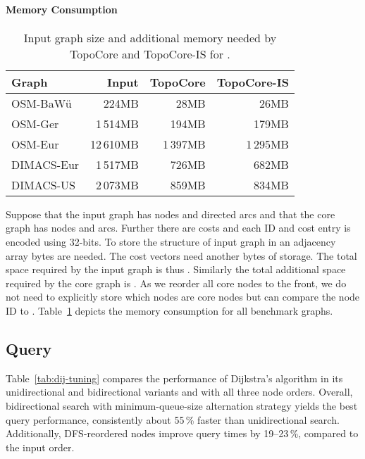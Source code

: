 \documentclass{sig-alternate}
\begin{document}
\paragraph{Memory Consumption}

\begin{table}
\caption{\label{tab:memory}Input graph size and additional memory needed by TopoCore and TopoCore-IS for .}
\begin{centering}
\begin{tabular}{lrrr}
\toprule
Graph & Input & TopoCore & TopoCore-IS \\
\midrule
OSM-BaWü & 224MB & 28MB & 26MB \\
OSM-Ger & 1\,514MB & 194MB & 179MB \\
OSM-Eur & 12\,610MB & 1\,397MB & 1\,295MB \\
 \addlinespace
DIMACS-Eur & 1\,517MB & 726MB & 682MB \\
DIMACS-US & 2\,073MB & 859MB & 834MB \\
\bottomrule
\end{tabular}
\par\end{centering}
\end{table}

Suppose that the input graph has  nodes and  directed arcs and that the core graph has  nodes and  arcs. 
Further there are  costs and each ID and cost entry is encoded using 32-bits. 
To store the structure of input graph in an adjacency array  bytes are needed.
The cost vectors need another  bytes of storage.
The total space required by the input graph is thus .
Similarly the total additional space required by the core graph is . 
As we reorder all core nodes to the front, we do not need to explicitly store which nodes are core nodes but can compare the node ID to .
Table~\ref{tab:memory} depicts the memory consumption for all benchmark graphs.

\subsection{Query}




Table~\ref{tab:dij-tuning} compares the performance
of Dijkstra's algorithm in its unidirectional
and bidirectional variants and with all three node orders.
Overall, bidirectional search with minimum-queue-size alternation
strategy yields the best query performance, consistently about 55\,\% faster than unidirectional search.
Additionally, DFS-reordered nodes improve query times by 19--23\,\%, compared to the input order.
\end{document}
